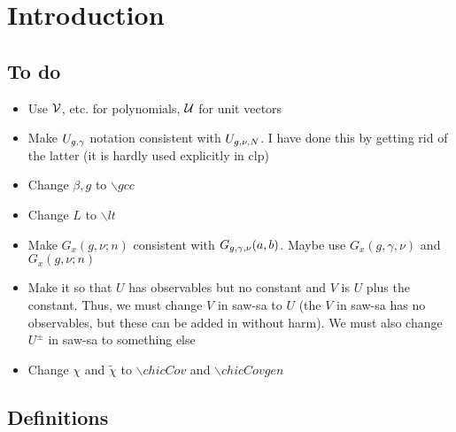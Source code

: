 
\chapter{Introduction}

\section{To do}

\begin{itemize}
\item
Use $\mathcal{V}$, etc. for polynomials, $\mathcal{U}$ for unit vectors

\item
Make $U_{g,\gamma}$ notation consistent with $U_{g,\nu,N}$.
I have done this by getting rid of the latter (it is hardly used
explicitly in clp)

\item
Change $\beta, g$ to $\backslash gcc$

\item
Change $L$ to $\backslash lt$

\item
Make $G_x(g, \nu; n)$ consistent with $G_{g,\gamma,\nu}(a, b)$.
Maybe use $G_x(g, \gamma, \nu)$ and $G_x(g, \nu; n)$

\item
Make it so that $U$ has observables but no constant and $V$ is $U$
plus the constant. Thus, we must change $V$ in saw-sa to $U$ (the $V$
in saw-sa has no observables, but these can be added in without harm).
We must also change $U^\pm$ in saw-sa to something else

\item
Change $\chi$ and $\tilde\chi$ to $\backslash chicCov$ and $\backslash chicCovgen$
\end{itemize}

\section{Definitions}


